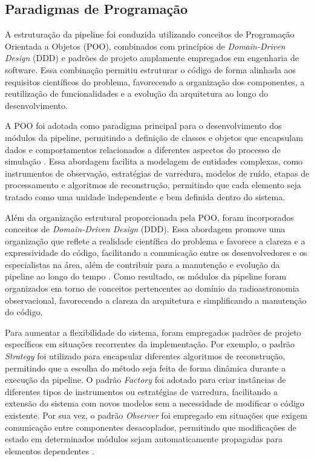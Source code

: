 \subsection{Paradigmas de Programação}

A estruturação da pipeline foi conduzida utilizando conceitos de Programação Orientada a Objetos (POO), combinados com princípios de \textit{Domain-Driven Design} (DDD) e padrões de projeto amplamente empregados em engenharia de software. Essa combinação permitiu estruturar o código de forma alinhada aos requisitos científicos do problema, favorecendo a organização dos componentes, a reutilização de funcionalidades e a evolução da arquitetura ao longo do desenvolvimento.

A POO foi adotada como paradigma principal para o desenvolvimento dos módulos da pipeline, permitindo a definição de classes e objetos que encapsulam dados e comportamentos relacionados a diferentes aspectos do processo de simulação \cite{gamma1994designpatterns}. Essa abordagem facilita a modelagem de entidades complexas, como instrumentos de observação, estratégias de varredura, modelos de ruído, etapas de processamento e algoritmos de reconstrução, permitindo que cada elemento seja tratado como uma unidade independente e bem definida dentro do sistema.

Além da organização estrutural proporcionada pela POO, foram incorporados conceitos de \textit{Domain-Driven Design} (DDD). Essa abordagem promove uma organização que reflete a realidade científica do problema e favorece a clareza e a expressividade do código, facilitando a comunicação entre os desenvolvedores e os especialistas na área, além de contribuir para a manutenção e evolução da pipeline ao longo do tempo \cite{evans2003ddd}. Como resultado, os módulos da pipeline foram organizados em torno de conceitos pertencentes ao domínio da radioastronomia observacional, favorecendo a clareza da arquitetura e simplificando a manutenção do código.

Para aumentar a flexibilidade do sistema, foram empregados padrões de projeto específicos em situações recorrentes da implementação. Por exemplo, o padrão \textit{Strategy} foi utilizado para encapsular diferentes algoritmos de reconstrução, permitindo que a escolha do método seja feita de forma dinâmica durante a execução da pipeline. O padrão \textit{Factory} foi adotado para criar instâncias de diferentes tipos de instrumentos ou estratégias de varredura, facilitando a extensão do sistema com novos modelos sem a necessidade de modificar o código existente. Por sua vez, o padrão \textit{Observer} foi empregado em situações que exigem comunicação entre componentes desacoplados, permitindo que modificações de estado em determinados módulos sejam automaticamente propagadas para elementos dependentes \cite{gamma1994designpatterns}.

